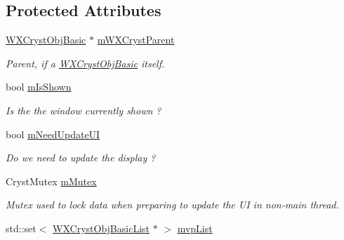 \subsection*{Protected Attributes}
\begin{DoxyCompactItemize}
\item 
\mbox{\label{class_obj_cryst_1_1_w_x_cryst_obj_basic_a88dcbf30ebdba0af900ddb96f6656d35}} 
\mbox{\hyperlink{class_obj_cryst_1_1_w_x_cryst_obj_basic}{W\+X\+Cryst\+Obj\+Basic}} $\ast$ \mbox{\hyperlink{class_obj_cryst_1_1_w_x_cryst_obj_basic_a88dcbf30ebdba0af900ddb96f6656d35}{m\+W\+X\+Cryst\+Parent}}
\begin{DoxyCompactList}\small\item\em Parent, if a \mbox{\hyperlink{class_obj_cryst_1_1_w_x_cryst_obj_basic}{W\+X\+Cryst\+Obj\+Basic}} itself. \end{DoxyCompactList}\item 
\mbox{\label{class_obj_cryst_1_1_w_x_cryst_obj_basic_a30748880e83e6fdad8c02b259230bb38}} 
bool \mbox{\hyperlink{class_obj_cryst_1_1_w_x_cryst_obj_basic_a30748880e83e6fdad8c02b259230bb38}{m\+Is\+Shown}}
\begin{DoxyCompactList}\small\item\em Is the the window currently shown ? \end{DoxyCompactList}\item 
\mbox{\label{class_obj_cryst_1_1_w_x_cryst_obj_basic_a9d51a7d7bab34f36355f9a42bab0a128}} 
bool \mbox{\hyperlink{class_obj_cryst_1_1_w_x_cryst_obj_basic_a9d51a7d7bab34f36355f9a42bab0a128}{m\+Need\+Update\+UI}}
\begin{DoxyCompactList}\small\item\em Do we need to update the display ? \end{DoxyCompactList}\item 
\mbox{\label{class_obj_cryst_1_1_w_x_cryst_obj_basic_a3e67ef5a254b9d6a2b766708e0942828}} 
Cryst\+Mutex \mbox{\hyperlink{class_obj_cryst_1_1_w_x_cryst_obj_basic_a3e67ef5a254b9d6a2b766708e0942828}{m\+Mutex}}
\begin{DoxyCompactList}\small\item\em Mutex used to lock data when preparing to update the UI in non-\/main thread. \end{DoxyCompactList}\item 
std\+::set$<$ \mbox{\hyperlink{class_obj_cryst_1_1_w_x_cryst_obj_basic_list}{W\+X\+Cryst\+Obj\+Basic\+List}} $\ast$ $>$ \mbox{\hyperlink{class_obj_cryst_1_1_w_x_cryst_obj_basic_acdf122c5232f3902d342afdc95e56bc2}{mvp\+List}}
\end{DoxyCompactItemize}


